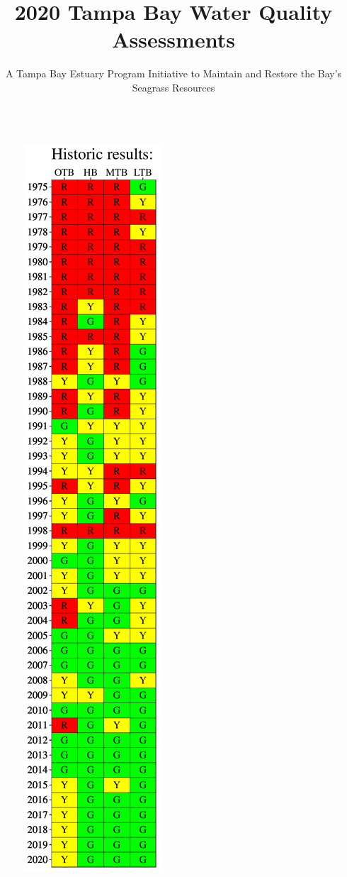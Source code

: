 \documentclass[final,t]{beamer}\usepackage[]{graphicx}\usepackage[]{color}
\title{\Large 2020 Tampa Bay Water Quality Assessments}
\author{\normalsize A Tampa Bay Estuary Program Initiative to Maintain and Restore the Bay's Seagrass Resources}
\begin{document}
\begin{frame}

\vspace{-0.4cm} %
\begin{columns}[t]

\begin{column}{.2\linewidth}

\vspace{-0.2in}


\begin{figure}
\centerline{\includegraphics[trim = 0cm 0cm 0cm 0cm, width=1.1\linewidth]{figure/attainmat.pdf}}

\end{figure}
\end{column}
\end{columns}
\end{frame}
\end{document}
